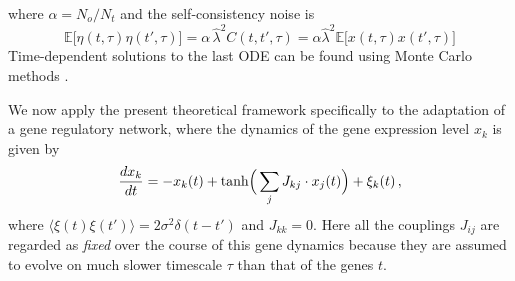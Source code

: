 \documentclass[%
 reprint,
superscriptaddress,
 amsmath,amssymb,
 prl,
]{revtex4-2}
\begin{document}
where  $\alpha=N_o/N_t$ and the self-consistency noise is 
\begin{equation}
\mathbb{E}\Big[ \eta(t,\tau) \eta(t', \tau) \Big] =  \alpha\, \hat{\lambda}^2 C(t,t', \tau) =  \alpha\hat{\lambda}^2 \mathbb{E}\Big[ x(t,\tau) x(t', \tau)\Big]
\label{self_consistency_noise}
\end{equation}
Time-dependent solutions to the last ODE can be found using Monte Carlo methods  \cite{Eissfeller, Roy2019}. %


 We now apply the present theoretical framework specifically to the adaptation of a gene regulatory network, where the dynamics of the gene expression level $x_k$ is given by \cite{KanekoPloSOne2007,GLASS, MJOLSNESS, Furusawa2008, Salazar-Ciudad, Ciliberti} 
\begin{equation}
      \frac{d x_k}{dt} = - x_k(t) + {\rm tanh}\Big(\sum_{j} J_{kj}\cdot x_j(t) \Big)  + \xi_k(t)\,,\label{GRN_dynamics}
\end{equation}
where $\langle \xi(t) \xi(t') \rangle = 2 \sigma^2\delta(t-t')$ 
 and $J_{kk} = 0$. Here all the couplings $J_{ij}$ are regarded as \emph{fixed} over the course of this gene dynamics because they  are assumed to evolve on much slower timescale $\tau$ than that of the genes $t$. 
\end{document}
